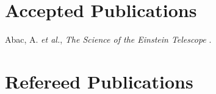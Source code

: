 \section{Accepted Publications}

\secstartswithlist{}%
\addtocounter{pubCounter}{-1}%
\begin{etaremune}[start=\value{pubCounter}]
    \renewcommand\labelenumi{[\theenumi]}
%
    \item Abac, A. \textit{et al.},
    \textit{The Science of the Einstein Telescope}
    .
%
    \setcounter{pubCounter}{\value{enumi}}
\end{etaremune}


\section{Refereed Publications}

